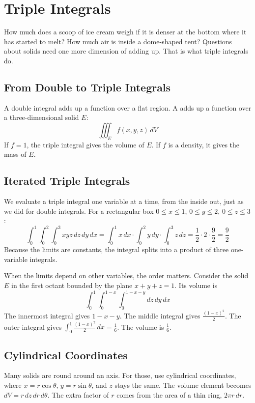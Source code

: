 \chapter{Triple Integrals}

How much does a scoop of ice cream weigh if it is denser at the bottom where it
has started to melt? How much air is inside a dome-shaped tent? Questions about
solids need one more dimension of adding up. That is what triple integrals do.

\section{From Double to Triple Integrals}
A double integral adds up a function over a flat region. A
 adds up a function over a
three-dimensional solid $E$:
$$\iiint_E f(x, y, z)\,dV$$
If $f = 1$, the triple integral gives the volume of $E$. If $f$ is a density,
it gives the mass of $E$.

\section{Iterated Triple Integrals}
We evaluate a triple integral one variable at a time, from the inside out, just
as we did for double integrals. For a rectangular box
$0 \leq x \leq 1$, $0 \leq y \leq 2$, $0 \leq z \leq 3$:
$$\int_0^1 \int_0^2 \int_0^3 xyz\,dz\,dy\,dx
= \int_0^1 x\,dx \cdot \int_0^2 y\,dy \cdot \int_0^3 z\,dz
= \frac{1}{2} \cdot 2 \cdot \frac{9}{2} = \frac{9}{2}$$
Because the limits are constants, the integral splits into a product of three
one-variable integrals.

When the limits depend on other variables, the order matters. Consider the
solid $E$ in the first octant bounded by the plane $x + y + z = 1$. Its volume is
$$\int_0^1 \int_0^{1-x} \int_0^{1-x-y} dz\,dy\,dx$$
The innermost integral gives $1 - x - y$. The middle integral gives
$\frac{(1-x)^2}{2}$. The outer integral gives
$\int_0^1 \frac{(1-x)^2}{2}\,dx = \frac{1}{6}$. The volume is $\frac{1}{6}$.

\section{Cylindrical Coordinates}
Many solids are round around an axis. For those, use cylindrical coordinates,
where $x = r\cos\theta$, $y = r\sin\theta$, and $z$ stays the same. The volume
element becomes $dV = r\,dz\,dr\,d\theta$. The extra factor of $r$ comes from
the area of a thin ring, $2\pi r\,dr$.

